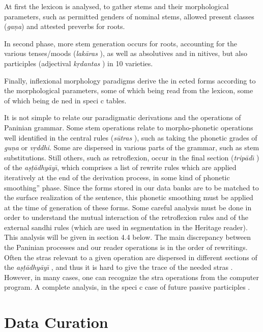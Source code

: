 \documentclass[11pt]{article}
\begin{document}
At first the lexicon is analysed, to gather stems and their morphological parameters, such as permitted genders of nominal stems, allowed present classes (\textit{ga\d{n}a}) and attested preverbs for roots. 

In second phase, more stem generation occurs for roots, accounting  for the various tenses/moods (\textit{lak\={a}ras} ), as well as absolutives and in nitives, but also participles (adjectival \textit{k\d{r}dantas} ) in 10 varieties. 

Finally, inflexional  morphology  paradigms  derive  the  in ected  forms  according  to  the morphological parameters, some of which being read from the lexicon, some of which being de ned in speci c tables. 

It is not simple to relate our paradigmatic derivations and the operations of Paninian grammar. Some stem operations relate to morpho-phonetic operations well identified in the central rules (\textit{s\={u}tras} ), such as taking the phonetic grades of \textit{gu\d{n}a} or \textit{v\d{r}ddhi}. Some are dispersed in various parts of the grammar, such as stem substitutions. Still others, such as retroflexion, occur in the  final section (\textit{trip\={a}d\={\i}} )  of  the \textit{a\d{s}\d{t}\={a}dhy\={a}y\={\i}},  which  comprises  a  list  of  rewrite  rules  which  are applied iteratively at the end of the derivation process, in some kind of phonetic smoothing'' phase. Since the forms stored in our data banks are to be matched to the surface realization of the sentence, this phonetic smoothing must be applied at the time of generation of these forms. Some careful analysis must be done in order to understand the mutual interaction of the retroflexion rules and of the external sandhi rules (which are used in segmentation in the Heritage reader). This analysis will be given in section 4.4 below. The main discrepancy between the Paninian processes and our reader operations is in the order of rewritings. Often the stras relevant to a given operation are dispersed in different sections of the \textit{a\d{s}\d{t}\={a}dhy\={a}y\={\i}} , and thus it is hard to give the trace of the needed stras . However, in many cases, one can recognize the stra operations from the computer program. A complete analysis, in the speci c case of future passive participles .


\section{Data Curation}
\end{document}
